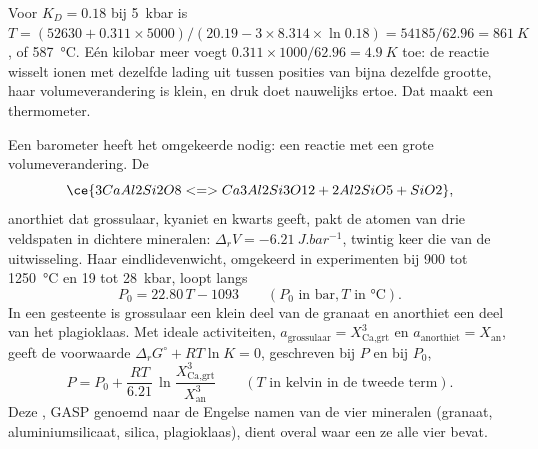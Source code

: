 \begin{omfigure}
\centering
{}
\par{}
\end{omfigure}

Voor $K_D = 0.18$ bij \qty{5}{kbar} is $T = (52630 + 0.311\times5000)/(20.19 - 3\times8.314
\times\ln 0.18) = 54185/62.96 = \qty{861}{K}$, of \qty{587}{\celsius}. Eén kilobar meer
voegt $0.311\times1000/62.96 = \qty{4.9}{K}$ toe: de reactie wisselt ionen met dezelfde lading
uit tussen posities van bijna dezelfde grootte, haar volumeverandering is klein, en druk doet nauwelijks
ertoe. Dat maakt een thermometer.

Een barometer heeft het omgekeerde nodig: een reactie met een grote volumeverandering. De
\[
\ce{3 CaAl2Si2O8 <=> Ca3Al2Si3O12 + 2 Al2SiO5 + SiO2},
\]
anorthiet dat grossulaar, kyaniet en kwarts geeft, pakt de atomen van drie veldspaten in
dichtere mineralen: $\Delta_r V = \qty{-6.21}{J.bar^{-1}}$, twintig keer die van de uitwisseling.
Haar eindlidevenwicht, omgekeerd in experimenten bij 900 tot \qty{1250}{\celsius} en 19
tot \qty{28}{kbar}, loopt langs
\[
P_0 = 22.80\,T - 1093 \qquad (P_0 \text{ in bar}, T \text{ in } \unit{\celsius}).
\]
In een gesteente is grossulaar een klein deel van de granaat en anorthiet een deel van het
plagioklaas. Met ideale activiteiten, $a_{\text{grossulaar}} = X_{\text{Ca,grt}}^3$ en
$a_{\text{anorthiet}} = X_{\text{an}}$, geeft de voorwaarde $\Delta_r G^\circ + RT\ln K = 0$,
geschreven bij $P$ en bij $P_0$,
\[
P = P_0 + \frac{RT}{6.21}\,\ln\frac{X_{\text{Ca,grt}}^3}{X_{\text{an}}^3}
\qquad (T \text{ in kelvin in de tweede term}).
\]
Deze , GASP genoemd naar de Engelse namen van de vier mineralen (granaat, aluminiumsilicaat,
silica, plagioklaas), dient overal waar een  ze alle vier bevat.

